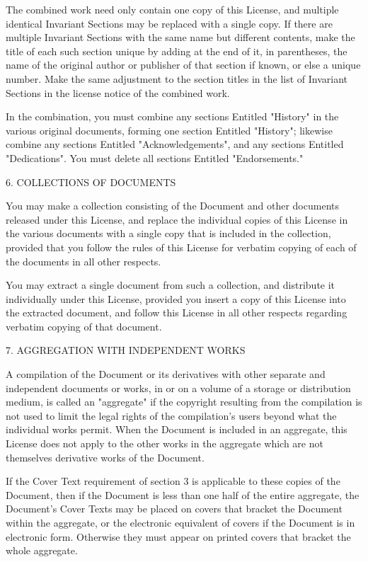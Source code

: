 \documentclass[oneside,english,a4paper,10pt,oneside,openany,final]{memoir}
\begin{document}
The combined work need only contain one copy of this License, and multiple identical Invariant Sections may be replaced with a single copy. If there are multiple Invariant Sections with the same name but different contents, make the title of each such section unique by adding at the end of it, in parentheses, the name of the original author or publisher of that section if known, or else a unique number. Make the same adjustment to the section titles in the list of Invariant Sections in the license notice of the combined work.

In the combination, you must combine any sections Entitled "History" in the various original documents, forming one section Entitled "History"; likewise combine any sections Entitled "Acknowledgements", and any sections Entitled "Dedications". You must delete all sections Entitled "Endorsements."

6. COLLECTIONS OF DOCUMENTS

You may make a collection consisting of the Document and other documents released under this License, and replace the individual copies of this License in the various documents with a single copy that is included in the collection, provided that you follow the rules of this License for verbatim copying of each of the documents in all other respects.

You may extract a single document from such a collection, and distribute it individually under this License, provided you insert a copy of this License into the extracted document, and follow this License in all other respects regarding verbatim copying of that document.

7. AGGREGATION WITH INDEPENDENT WORKS

A compilation of the Document or its derivatives with other separate and independent documents or works, in or on a volume of a storage or distribution medium, is called an "aggregate" if the copyright resulting from the compilation is not used to limit the legal rights of the compilation's users beyond what the individual works permit. When the Document is included in an aggregate, this License does not apply to the other works in the aggregate which are not themselves derivative works of the Document.

If the Cover Text requirement of section 3 is applicable to these copies of the Document, then if the Document is less than one half of the entire aggregate, the Document's Cover Texts may be placed on covers that bracket the Document within the aggregate, or the electronic equivalent of covers if the Document is in electronic form. Otherwise they must appear on printed covers that bracket the whole aggregate.
\end{document}
